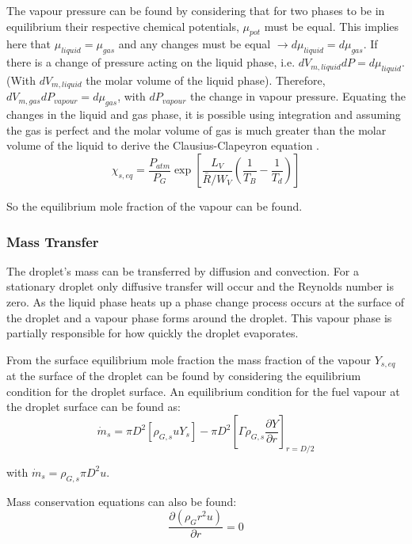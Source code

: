 \documentclass[../Interim_Report_Master]{subfiles}
\begin{document}
The vapour pressure can be found by considering that for two phases to be in equilibrium their respective chemical potentials, $\mu_{pot}$ must be equal. This implies here that $\mu_{liquid}=\mu_{gas}$ and any changes must be equal $\to d\mu_{liquid}=d\mu_{gas}$. If there is a change of pressure acting on the liquid phase, i.e. $dV_{m, liquid}dP=d\mu_{liquid}$. (With $dV_{m, liquid}$ the molar volume of the liquid phase). Therefore, $dV_{m, gas}dP_{vapour}=d\mu_{gas}$, with $dP_{vapour}$ the change in vapour pressure. Equating the changes in the liquid and gas phase, it is possible using integration and assuming the gas is perfect and the molar volume of gas is much greater than the molar volume of the liquid to derive the Clausius-Clapeyron equation \cite{atkins_paula_2010}. 
\begin{equation}
\chi_{s,eq} = \frac{P_{atm}}{P_G}\exp \left[\frac{L_V}{\bar{R}/W_V}\left(\frac{1}{T_B}-\frac{1}{T_d}\right)\right] 
\end{equation}

So the equilibrium mole fraction of the vapour can be found.

\subsubsection{Mass Transfer}\label{sec:mass_transfer}
The droplet's mass can be transferred by diffusion and convection. For a stationary droplet only diffusive transfer will occur and the Reynolds number is zero. As the liquid phase heats up a phase change process occurs at the surface of the droplet and a vapour phase forms around the droplet. This vapour phase is partially responsible for how quickly the droplet evaporates. 

From the surface equilibrium mole fraction the mass fraction of the vapour $Y_{s,eq}$ at the surface of the droplet can be found by considering the equilibrium condition for the droplet surface. An equilibrium condition for the fuel vapour at the droplet surface can be found as:
\begin{equation}
\dot{m}_{s} = \pi D^2[\rho_{G,s} u Y_s] - \pi D^2\left[\Gamma\rho_{G,s}\frac{\partial Y}{ \partial r}\right]_{r=D/2}
\end{equation}

with $\dot{m}_{s}= \rho_{G,s}\pi D^2 u$. 

Mass conservation equations can also be found:
\begin{equation}
\frac{\partial (\rho_G r^2 u)}{\partial r} = 0
\end{equation} 
\end{document}
